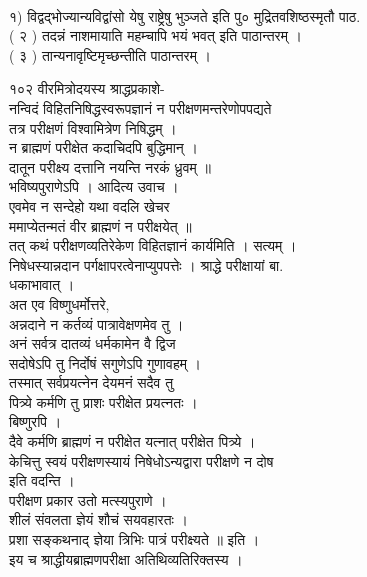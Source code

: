 \documentclass[11pt, openany]{book}
\begin{document}
{{{{{{{{{{{{{{{{%

{\\
१) विद्वद्भोज्यान्यविद्वांसो येषु राष्ट्रेषु भुञ्जते इति पु०
मुद्रितवशिष्ठस्मृतौ पाठ. \textbar{}\\
( २ ) तदन्नं नाशमायाति महम्चापि भयं भवत् इति पाठान्तरम् ।\\
( ३ ) तान्यनावृष्टिमृच्छन्तीति पाठान्तरम् ।

{१०२ }{ वीरमित्रोदयस्य श्राद्धप्रकाशे-}{\\
नन्विदं विहितनिषिद्धस्वरूपज्ञानं न परीक्षणमन्तरेणोपपद्यते\\
तत्र परीक्षणं विश्वामित्रेण निषिद्धम् ।\\
न ब्राह्मणं परीक्षेत कदाचिदपि बुद्धिमान् ।\\
दातून परीक्ष्य दत्तानि नयन्ति नरकं ध्रुवम् ॥\\
भविष्यपुराणेऽपि । आदित्य उवाच ।\\
एवमेव न सन्देहो यथा वदलि खेचर \textbar{}\\
ममाप्येतन्मतं वीर ब्राह्मणं न परीक्षयेत् ॥\\
तत् कथं परीक्षणव्यतिरेकेण विहितज्ञानं कार्यमिति । सत्यम् ।\\
निषेधस्यान्नदान पर्गक्षापरत्वेनाप्युपपत्तेः । श्राद्धे परीक्षायां बा.\\
धकाभावात् ।\\
अत एव विष्णुधर्मोत्तरे,\\
अन्नदाने न कर्तव्यं पात्रावेक्षणमेव तु ।\\
अनं सर्वत्र दातव्यं धर्मकामेन वै द्विज \textbar{}\\
सदोषेऽपि तु निर्दोषं सगुणेऽपि गुणावहम् ।\\
तस्मात् सर्वप्रयत्नेन देयमनं सदैव तु \textbar{}\textbar{}\\
पित्र्ये कर्मणि तु प्राशः परीक्षेत प्रयत्नतः ।\\
बिष्णुरपि ।\\
दैवे कर्मणि ब्राह्मणं न परीक्षेत यत्नात् परीक्षेत पित्र्ये ।\\
केचित्तु स्वयं परीक्षणस्यायं निषेधोऽन्यद्वारा परीक्षणे न दोष\\
इति वदन्ति ।\\
परीक्षण प्रकार उतो मत्स्यपुराणे ।\\
शीलं संवलता ज्ञेयं शौचं सयवहारतः ।\\
प्रशा सङ्कथनाद् ज्ञेया त्रिभिः पात्रं परीक्ष्यते ॥ इति ।\\
इय च श्राद्धीयब्राह्मणपरीक्षा अतिथिव्यतिरिक्तस्य ।\\
}}}}}}}}}}}}}}}}}}
\end{document}
